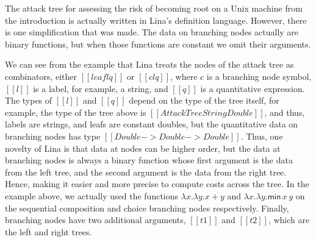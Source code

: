 The attack tree for assessing the risk of becoming root on a Unix
machine from the introduction is actually written in Lina's definition
language.  However, there is one simplification that was made.  The
data on branching nodes actually are binary functions, but when those
functions are constant we omit their arguments.

We can see from the example that Lina treats the nodes of the attack
tree as combinators, either $[[leaf l q]]$ or $[[c l q]]$, where $c$
is a branching node symbol, $[[l]]$ is a label, for example, a string,
and $[[q]]$ is a quantitative expression.  The types of $[[l]]$ and
$[[q]]$ depend on the type of the tree itself, for example, the type
of the tree above is $[[AttackTree String Double]]$, and thus, labels
are strings, and leafs are constant doubles, but the quantitative data
on branching nodes has type $[[Double -> Double -> Double]]$. Thus,
one novelty of Lina is that data at nodes can be higher order, but the
data at branching nodes is always a binary function whose first
argument is the data from the left tree, and the second argument is
the data from the right tree. Hence, making it easier and more precise
to compute costs across the tree.  In the example above, we actually
used the functions $\lambda x.\lambda y.x + y$ and $\lambda x.\lambda
y.\mathsf{min}\,x\,y$ on the sequential composition and choice
branching nodes respectively.  Finally, branching nodes have two additional
arguments, $[[t1]]$ and $[[t2]]$, which are the left and right trees.

